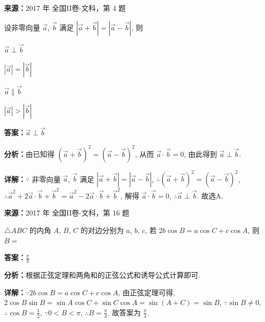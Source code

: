 \begin{question}[points=5]
\textbf{来源：}2017 年 全国II卷-文科，第 4 题\par
设非零向量 $\vec{a}$, $\vec{b}$ 满足 $|\vec{a}+\vec{b}|=|\vec{a}-\vec{b}|$, 则
\begin{choices}
  \item $\vec{a}\perp\vec{b}$
  \item $|\vec{a}|=|\vec{b}|$
  \item $\vec{a}\parallel\vec{b}$
  \item $|\vec{a}|>|\vec{b}|$
\end{choices}
\begin{solution}
\textbf{答案：}$\vec{a}\perp\vec{b}$

\textbf{分析：}由已知得 $(\vec{a}+\vec{b})^2=(\vec{a}-\vec{b})^2$, 从而 $\vec{a}\cdot\vec{b}=0$, 由此得到 $\vec{a}\perp\vec{b}$.

\textbf{详解：}$\because$ 非零向量 $\vec{a}$, $\vec{b}$ 满足 $|\vec{a}+\vec{b}|=|\vec{a}-\vec{b}|$, $\therefore (\vec{a}+\vec{b})^2=(\vec{a}-\vec{b})^2$, $\therefore \vec{a}^2+2\vec{a}\cdot\vec{b}+\vec{b}^2=\vec{a}^2-2\vec{a}\cdot\vec{b}+\vec{b}^2$, 解得 $\vec{a}\cdot\vec{b}=0$, $\therefore \vec{a}\perp\vec{b}$. 故选A.
\end{solution}
\end{question}

\begin{question}[points=5]
\textbf{来源：}2017 年 全国II卷-文科，第 16 题\par
$\triangle ABC$ 的内角 $A$, $B$, $C$ 的对边分别为 $a$, $b$, $c$, 若 $2b\cos B=a\cos C+c\cos A$, 则 $B=$
\fillin[{$\frac{\pi}{3}$}]
\begin{solution}
\textbf{答案：}$\frac{\pi}{3}$

\textbf{分析：}根据正弦定理和两角和的正弦公式和诱导公式计算即可.

\textbf{详解：}$\because 2b\cos B=a\cos C+c\cos A$, 由正弦定理可得, $2\cos B\sin B=\sin A\cos C+\sin C\cos A=\sin(A+C)=\sin B$, $\because \sin B\neq0$, $\therefore \cos B=\frac{1}{2}$, $\because 0<B<\pi$, $\therefore B=\frac{\pi}{3}$. 故答案为 $\frac{\pi}{3}$.
\end{solution}
\end{question}

